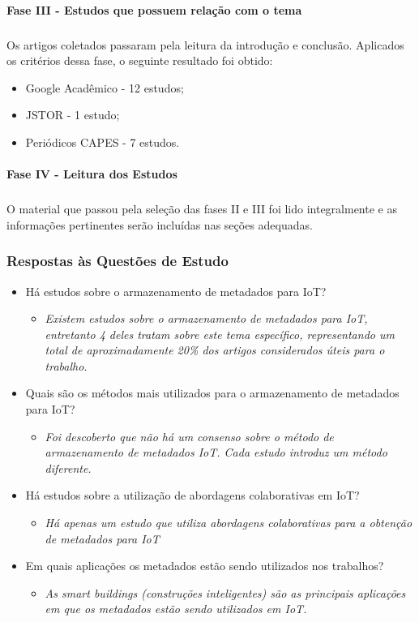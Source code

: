 \paragraph{Fase III - Estudos que possuem relação com o tema}
\subparagraph{}
\quad Os artigos coletados passaram pela leitura da introdução e conclusão.
Aplicados os critérios dessa fase, o seguinte resultado foi obtido:
\begin{itemize}
  \item Google Acadêmico - 12 estudos;
  \item JSTOR - 1 estudo;
  \item Periódicos CAPES - 7 estudos.
\end{itemize}
\paragraph{Fase IV - Leitura dos Estudos}
\subparagraph{}
\quad O material que passou pela seleção das fases II e III foi lido integralmente e as
informações pertinentes serão incluídas nas seções adequadas.
\subsubsection{Respostas às Questões de Estudo}
\begin{itemize}
  \item Há estudos sobre o armazenamento de metadados para \acrlong{IoT}?
 \begin{itemize}
    \item \textit{Existem estudos sobre o armazenamento de metadados para \acrshort{IoT}, entretanto 4 deles tratam
    sobre este tema específico, representando um total de aproximadamente 20\% dos artigos considerados úteis para o trabalho.}
  \end{itemize}
  \item Quais são os métodos mais utilizados para o armazenamento de metadados para \acrshort{IoT}?
    \begin{itemize}
    \item \textit{Foi descoberto que não há um consenso sobre o método de armazenamento de metadados \acrshort{IoT}. Cada estudo introduz um método diferente.}
  \end{itemize}
  \item Há estudos sobre a utilização de abordagens colaborativas em \acrlong{IoT}?
  \begin{itemize}
    \item \textit{Há apenas um estudo que utiliza abordagens colaborativas para a obtenção de metadados para \acrshort{IoT}}
  \end{itemize}
  \item Em quais aplicações os metadados estão sendo utilizados nos trabalhos?
  \begin{itemize}
    \item \textit{As smart buildings (construções inteligentes) são as principais aplicações em que os metadados estão sendo utilizados em \acrshort{IoT}.}
  \end{itemize}
\end{itemize}

